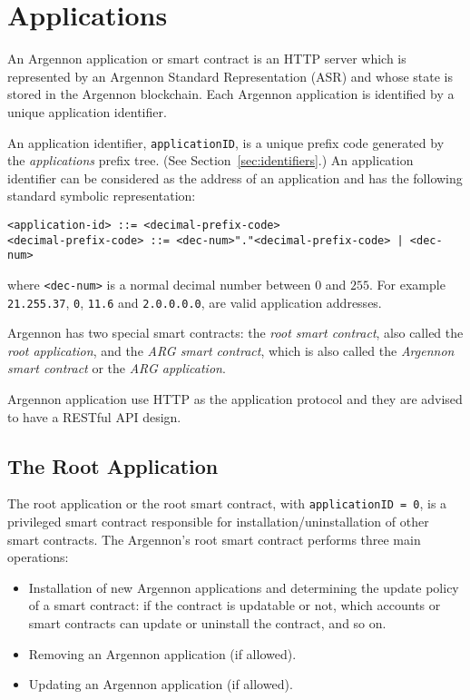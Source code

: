 

\section{Applications}\label{sec:applications}

An Argennon application or smart contract is an HTTP server which is represented by an Argennon Standard
Representation (ASR) and whose state is stored in the Argennon blockchain. Each Argennon application is identified by
a unique application identifier.

An application identifier, \texttt{applicationID}, is
a unique prefix code generated by the \emph{applications} prefix tree. (See Section~\ref{sec:identifiers}.)
An application identifier can be considered as the address of an application and has the following standard symbolic
representation:
\begin{verbatim}
<application-id> ::= <decimal-prefix-code>
<decimal-prefix-code> ::= <dec-num>"."<decimal-prefix-code> | <dec-num>
\end{verbatim}
where \texttt{<dec-num>} is a normal decimal number between $0$ and $255$. For example \texttt{21.255.37},
\texttt{0}, \texttt{11.6} and \texttt{2.0.0.0.0}, are valid application addresses.

Argennon has two special smart contracts: the \emph{root smart contract}, also called the \emph{root application}, and
the \emph{ARG smart contract}, which is also called the \emph{Argennon smart contract} or the \emph{ARG application}.

Argennon application use HTTP as the application protocol and they are advised to have a RESTful API design.

\subsection{The Root Application}\label{subsec:the-root-app}

The root application or the root smart contract, with \texttt{applicationID = 0}, is a privileged smart contract
responsible for installation/uninstallation of other smart contracts. The Argennon's root smart contract
performs three main operations:

\begin{itemize}
    \item Installation of new Argennon applications and determining the update policy of a smart
    contract: if the contract is updatable or not, which accounts or smart contracts can update or uninstall
    the contract, and so on.
    \item Removing an Argennon application (if allowed).
    \item Updating an Argennon application (if allowed).
\end{itemize}

